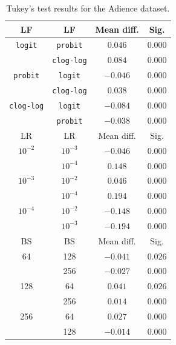 \documentclass[journal]{IEEEtran}
\begin{document}
	\begin{table}[!t]
		\caption{Tukey's test results for the Adience dataset.}
		\label{table:TukeyAdience}
		\centering
		\begin{tabular}{cccc}
			\hline\hline
			       LF         &        LF         & Mean diff. &  Sig.   \\ \hline
			 \texttt{logit}   &  \texttt{probit}  &  $0.046$   & $0.000$ \\
			                  & \texttt{clog-log} &  $0.084$   & $0.000$ \\
			 \texttt{probit}  &  \texttt{logit}   &  $-0.046$  & $0.000$ \\
			                  & \texttt{clog-log} &  $0.038$   & $0.000$ \\
			\texttt{clog-log} &  \texttt{logit}   &  $-0.084$  & $0.000$ \\
			                  &  \texttt{probit}  &  $-0.038$  & $0.000$ \\ \hline\hline
			       LR         &        LR         & Mean diff. &  Sig.   \\ \hline
			    $10^{-2}$     &     $10^{-3}$     &  $-0.046$  & $0.000$ \\
			                  &     $10^{-4}$     &  $0.148$   & $0.000$ \\
			    $10^{-3}$     &     $10^{-2}$     &  $0.046$   & $0.000$ \\
			                  &     $10^{-4}$     &  $0.194$   & $0.000$ \\
			    $10^{-4}$     &     $10^{-2}$     &  $-0.148$  & $0.000$ \\
			                  &     $10^{-3}$     &  $-0.194$  & $0.000$ \\ \hline\hline
			       BS         &        BS         & Mean diff. &  Sig.   \\ \hline
			       64         &        128        &  $-0.041$  & $0.026$ \\
			                  &        256        &  $-0.027$  & $0.000$ \\
			       128        &        64         &  $0.041$   & $0.026$ \\
			                  &        256        &  $0.014$   & $0.000$ \\
			       256        &        64         &  $0.027$   & $0.000$ \\
			                  &        128        &  $-0.014$  & $0.000$ \\ \hline\hline
		\end{tabular}
	\end{table}
		
\end{document}
